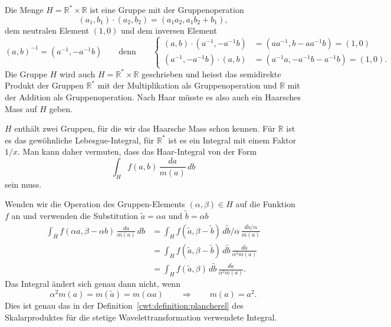 Die Menge $H=\mathbb R^*\times \mathbb R$ ist eine Gruppe mit der
Gruppenoperation
\[
(a_1,b_1)\cdot (a_2,b_2) = (a_1a_2,a_1b_2+b_1),
\]
dem neutralen Element $(1,0)$ und dem inversen Element
\[
(a,b)^{-1} = (a^{-1}, -a^{-1}b)
\qquad\text{denn}\qquad
\left\{
\begin{aligned}
(a,b)\cdot (a^{-1},-a^{-1}b)
&=
(aa^{-1},b-aa^{-1}b)=(1,0)
\\
(a^{-1},-a^{-1}b)\cdot (a,b)
&=
(a^{-1}a,-a^{-1}b-a^{-1}b)=(1,0).
\end{aligned}
\right.
\]
Die Gruppe $H$ wird auch $H=\mathbb R^*\times \mathbb R$ geschrieben
und heisst das semidirekte Produkt der Gruppen $\mathbb R^*$ mit der
Multiplikation als Gruppenoperation und $\mathbb R$ mit der Addition
als Gruppenoperation.
Nach Haar müsste es also auch ein Haarsches Mass auf $H$ geben.

$H$ enthält zwei Gruppen, für die wir das Haarsche Mass schon kennen.
Für $\mathbb R$ ist es das gewöhnliche Lebesgue-Integral, für $\mathbb R^*$
ist es ein Integral mit einem Faktor $1/x$.
Man kann daher vermuten, dass das Haar-Integral von der Form
\[
\int_H f(a,b) \,\frac{da}{m(a)}\,db
\]
sein muss.

Wenden wir die Operation des Gruppen-Elements $(\alpha,\beta)\in H$
auf die Funktion $f$ an und verwenden die Substitution
$\tilde{a}=\alpha a$ und $\tilde{b}=\alpha b$
\begin{align*}
\int_H f(\alpha a,\beta-\alpha b) \,\frac{da}{m(a)}\,db
&=
\int_H f(\tilde{a}, \beta - \tilde b) \,
d\tilde{b}/\alpha\,\frac{d\tilde{a}/\alpha}{m(a)}
\\
&=
\int_H f(\tilde{a}, \beta - \tilde b) \,
d\tilde{b}\,\frac{d\tilde{a}}{\alpha^2m(a)}
\\
&=
\int_H f(\tilde{a}, \beta) \,
d\tilde{b}\,\frac{d\tilde{a}}{\alpha^2m(a)}.
\end{align*}
Das Integral ändert sich genau dann nicht, wenn
\[
\alpha^2 m(a)
=
m(\tilde{a})
=
m(\alpha a)
\qquad\Rightarrow\qquad
m(a) = a^2.
\]
Dies ist genau das in der Definition~\ref{cwt:definition:plancherel}
des Skalarproduktes für die stetige Wavelettransformation verwendete
Integral.





